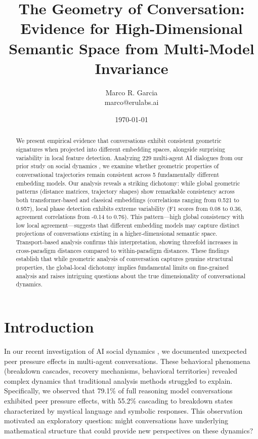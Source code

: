 \documentclass[11pt,letterpaper]{article}
\title{The Geometry of Conversation: Evidence for High-Dimensional Semantic Space from Multi-Model Invariance}
\author{
Marco R. Garcia \\
marco@erulabs.ai
}
\date{\today}
\newcommand{\totalConversations}{229}
\newcommand{\numEmbeddingModels}{5}
\newcommand{\minPairwiseCorr}{0.521}
\newcommand{\maxPairwiseCorr}{0.957}
\begin{document}
\maketitle

\begin{abstract}
We present empirical evidence that conversations exhibit consistent geometric signatures when projected into different embedding spaces, alongside surprising variability in local feature detection. Analyzing \totalConversations{} multi-agent AI dialogues from our prior study on social dynamics \citep{garcia2025peer}, we examine whether geometric properties of conversational trajectories remain consistent across \numEmbeddingModels{} fundamentally different embedding models. Our analysis reveals a striking dichotomy: while global geometric patterns (distance matrices, trajectory shapes) show remarkable consistency across both transformer-based and classical embeddings (correlations ranging from \minPairwiseCorr{} to \maxPairwiseCorr{}), local phase detection exhibits extreme variability (F1 scores from 0.08 to 0.36, agreement correlations from -0.14 to 0.76). This pattern—high global consistency with low local agreement—suggests that different embedding models may capture distinct projections of conversations existing in a higher-dimensional semantic space. Transport-based analysis confirms this interpretation, showing threefold increases in cross-paradigm distances compared to within-paradigm distances. These findings establish that while geometric analysis of conversation captures genuine structural properties, the global-local dichotomy implies fundamental limits on fine-grained analysis and raises intriguing questions about the true dimensionality of conversational dynamics.
\end{abstract}

\section{Introduction}

In our recent investigation of AI social dynamics \citep{garcia2025peer}, we documented unexpected peer pressure effects in multi-agent conversations. These behavioral phenomena (breakdown cascades, recovery mechanisms, behavioral territories) revealed complex dynamics that traditional analysis methods struggled to explain. Specifically, we observed that 79.1\% of full reasoning model conversations exhibited peer pressure effects, with 55.2\% cascading to breakdown states characterized by mystical language and symbolic responses. This observation motivated an exploratory question: might conversations have underlying mathematical structure that could provide new perspectives on these dynamics?
\end{document}
